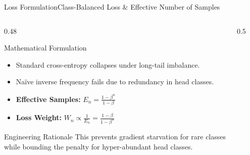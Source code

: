 \begin{frame}{Loss Formulation}{Class-Balanced Loss \& Effective Number of Samples}
    \begin{columns}[T]
        \begin{column}{0.48\textwidth}
            \begin{block}{Mathematical Formulation}
                \footnotesize
                \begin{itemize}
                    \item Standard cross-entropy collapses under long-tail imbalance.
                    \item Naïve inverse frequency fails due to redundancy in head classes.
                    \item \textbf{Effective Samples:} $E_n = \frac{1 - \beta^n}{1 - \beta}$
                    \item \textbf{Loss Weight:} $W_n \propto \frac{1}{E_n} = \frac{1 - \beta}{1 - \beta^n}$
                \end{itemize}
            \end{block}
            \vspace{-0.2cm}
            \begin{block}{Engineering Rationale}
                \footnotesize
                This prevents gradient starvation for rare classes while bounding the penalty for hyper-abundant head classes.
            \end{block}
        \end{column}
        \begin{column}{0.5\textwidth}
            \vspace{-0.2cm}
            \begin{figure}
                \centering
            \end{figure}
        \end{column}
    \end{columns}


\end{frame}
